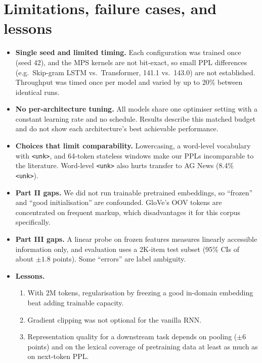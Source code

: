 \documentclass[10pt,a4paper]{article}
\newcommand{\tok}[1]{\texttt{\small #1}}
\begin{document}
\section{Limitations, failure cases, and lessons}\label{sec:lim}
\begin{itemize}
\item \textbf{Single seed and limited timing.} Each configuration was trained once (seed 42), and the MPS kernels are not bit-exact, so small PPL differences (e.g.\ Skip-gram LSTM vs.\ Transformer, 141.1 vs.\ 143.0) are not established. Throughput was timed once per model and varied by up to 20\% between identical runs.
\item \textbf{No per-architecture tuning.} All models share one optimiser setting with a constant learning rate and no schedule. Results describe this matched budget and do not show each architecture's best achievable performance.
\item \textbf{Choices that limit comparability.} Lowercasing, a word-level vocabulary with \tok{<unk>}, and 64-token stateless windows make our PPLs incomparable to the literature. Word-level \tok{<unk>} also hurts transfer to AG News (8.4\% \tok{<unk>}).
\item \textbf{Part II gaps.} We did not run trainable pretrained embeddings, so ``frozen'' and ``good initialisation'' are confounded. GloVe's OOV tokens are concentrated on frequent markup, which disadvantages it for this corpus specifically.
\item \textbf{Part III gaps.} A linear probe on frozen features measures linearly accessible information only, and evaluation uses a 2K-item test subset (95\% CIs of about $\pm1.8$ points). Some ``errors'' are label ambiguity.
\item \textbf{Lessons.}
  \begin{enumerate}
  \item With 2M tokens, regularisation by freezing a good in-domain embedding beat adding trainable capacity.
  \item Gradient clipping was not optional for the vanilla RNN.
  \item Representation quality for a downstream task depends on pooling ($\pm6$ points) and on the lexical coverage of pretraining data at least as much as on next-token PPL.
  \end{enumerate}
\end{itemize}
\end{document}
